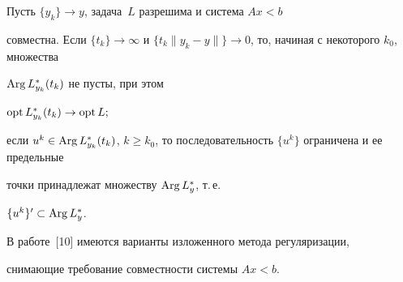 \begin{thm}


Пусть $\{y_k\}\to y$, задача~$L$ разрешима и система $Ax<b$


совместна. Если $\{t_k\}\to\infty$ и $\{t_k\| y_k-y


\|\}\to 0$, то, начиная с некоторого $k_0$, множества


$\operatorname{Arg} L_{y_k}^*(t_k)$ не пусты, при этом


$\operatorname{opt} L_{y_k}^*(t_k)\to \operatorname{opt} L;$


если $u^k\in \Arg L_{y_k}^*(t_k)$, $k\geq


k_0$, то последовательность $\{u^k\}$ ограничена и ее предельные


точки принадлежат множеству $\operatorname{Arg} L^*_y$, т.\,е.


$\{u^k\}'\subset \operatorname{Arg} L^*_y$.


\end{thm}





\noindent В работе~[10] имеются варианты изложенного метода регуляризации,


снимающие требование совместности системы $Ax<b$.





